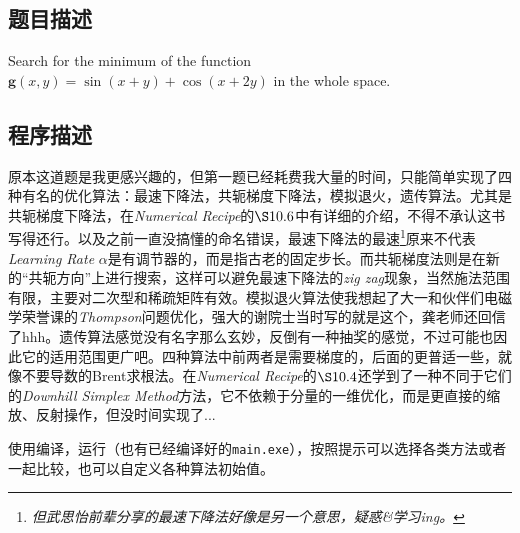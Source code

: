 \subsection{题目描述}
Search for the minimum of the function \( \mathbf{g}(x, y) = \sin(x + y) + \cos(x + 2y) \) in the whole space.
\subsection{程序描述}
原本这道题是我更感兴趣的，但第一题已经耗费我大量的时间，只能简单实现了四种有名的优化算法：最速下降法，共轭梯度下降法，模拟退火，遗传算法。尤其是共轭梯度下降法，在\textit{Numerical Recipe}的$\S 10.6$中有详细的介绍，不得不承认这书写得还行。以及之前一直没搞懂的命名错误，最速下降法的最速\footnote{\textit{但武思怡前辈分享的最速下降法好像是另一个意思，疑惑\&学习ing。}}原来不代表\textit{Learning Rate} \( \alpha\)是有调节器的，而是指古老的固定步长。而共轭梯度法则是在新的“共轭方向”上进行搜索，这样可以避免最速下降法的\textit{zig zag}现象，当然施法范围有限，主要对二次型和稀疏矩阵有效。模拟退火算法使我想起了大一和伙伴们电磁学荣誉课的\textit{Thompson}问题优化，强大的谢院士当时写的就是这个，龚老师还回信了hhh。遗传算法感觉没有名字那么玄妙，反倒有一种抽奖的感觉，不过可能也因此它的适用范围更广吧。四种算法中前两者是需要梯度的，后面的更普适一些，就像不要导数的Brent求根法。在\textit{Numerical Recipe}的$\S 10.4$还学到了一种不同于它们的\textit{Downhill Simplex Method}方法，它不依赖于分量的一维优化，而是更直接的缩放、反射操作，但没时间实现了...




使用编译，运行（也有已经编译好的\texttt{main.exe}），按照提示可以选择各类方法或者一起比较，也可以自定义各种算法初始值。
